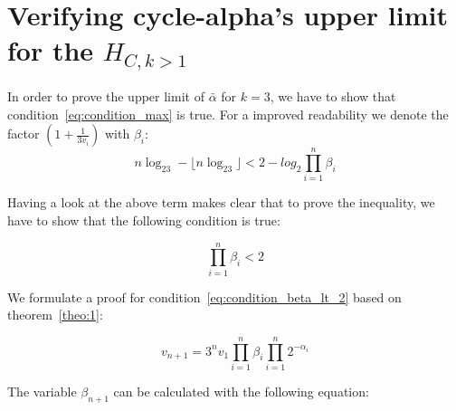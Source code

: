 


\section{Verifying cycle-alpha's upper limit for the $H_{C,k>1}$}

In order to prove the upper limit of $\bar\alpha$ for $k=3$, we have to show that condition~\ref{eq:condition_max} is true. For a improved readability we denote the factor $(1+\frac{1}{3v_i})$ with $\beta_i$:
\begin{equation*}
	n\log_23-\lfloor n\log_23\rfloor<2-log_2\prod_{i=1}^{n}\beta_i
\end{equation*}

Having a look at the above term makes clear that to prove the inequality, we have to show that the following condition is true:

\begin{equation}
\label{eq:condition_beta_lt_2}
	\prod_{i=1}^{n}\beta_i<2
\end{equation}

We formulate a proof for condition~\ref{eq:condition_beta_lt_2} based on theorem~\ref{theo:1}:

\begin{equation}
\label{eq:based_theo_1}
v_{n+1}=3^nv_1\prod_{i=1}^{n}\beta_i\prod_{i=1}^{n}2^{-\alpha_i}
\end{equation}

The variable $\beta_{n+1}$ can be calculated with the following equation:

